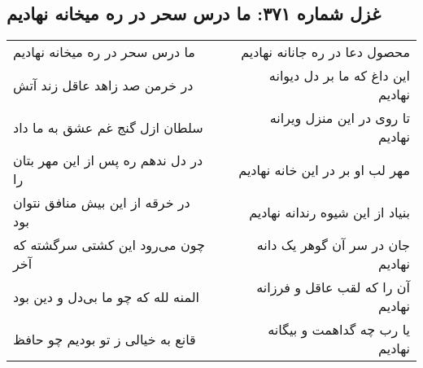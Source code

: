 \begin{center}
\section*{غزل شماره ۳۷۱: ما درس سحر در ره میخانه نهادیم}
\label{sec:sh371}
\begin{longtable}{l p{0.5cm} r}
ما درس سحر در ره میخانه نهادیم
&&
محصول دعا در ره جانانه نهادیم
\\
در خرمن صد زاهد عاقل زند آتش
&&
این داغ که ما بر دل دیوانه نهادیم
\\
سلطان ازل گنج غم عشق به ما داد
&&
تا روی در این منزل ویرانه نهادیم
\\
در دل ندهم ره پس از این مهر بتان را
&&
مهر لب او بر در این خانه نهادیم
\\
در خرقه از این بیش منافق نتوان بود
&&
بنیاد از این شیوه رندانه نهادیم
\\
چون می‌رود این کشتی سرگشته که آخر
&&
جان در سر آن گوهر یک دانه نهادیم
\\
المنه لله که چو ما بی‌دل و دین بود
&&
آن را که لقب عاقل و فرزانه نهادیم
\\
قانع به خیالی ز تو بودیم چو حافظ
&&
یا رب چه گداهمت و بیگانه نهادیم
\\
\end{longtable}
\end{center}
